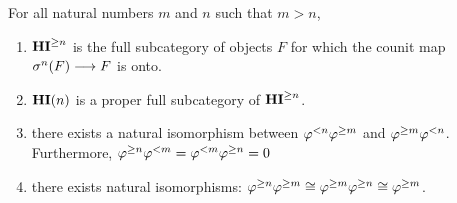 \begin{prop}\label{prop_THI_properties}
For all natural numbers $m$ and $n$ such that $m > n$,

\begin{enumerate}
\item $\mathbf{HI}^{\geq n}$ is the full subcategory of objects $F$ for which
the counit map $\sigma^{n}(F) \longrightarrow F$ is onto.
\tinyskip

\item $\mathbf{HI}(n)$ is a proper full subcategory of $\mathbf{HI}^{\geq n}$.
\tinyskip

\item there exists a natural isomorphism between 
$\varphi^{< n}\varphi^{\geq m}$ and $\varphi^{\geq m}\varphi^{< n}$. Furthermore,
$\varphi^{\geq n}\varphi^{< m} = \varphi^{< m}\varphi^{\geq n} = 0$ 
\tinyskip

\item there exists natural isomorphisms:
$\varphi^{\geq n}\varphi^{\geq m} \cong \varphi^{\geq m}\varphi^{\geq n} \cong \varphi^{\geq m}$.
\tinyskip
\end{enumerate}
\end{prop}
